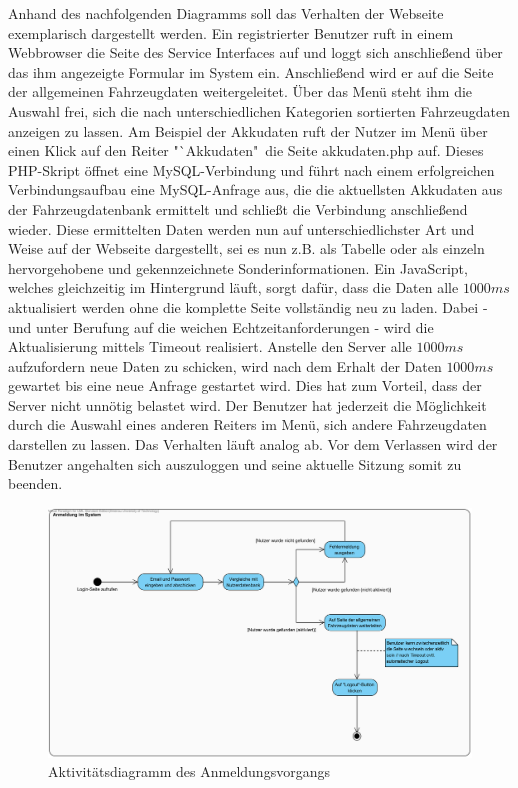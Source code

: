 \documentclass[fontsize = 12pt, paper = a4]{scrreprt}
\begin{document}
Anhand des nachfolgenden Diagramms soll das Verhalten der Webseite exemplarisch dargestellt werden. Ein registrierter Benutzer ruft in einem Webbrowser die Seite des Service Interfaces auf und loggt sich anschließend über das ihm angezeigte Formular im System ein. Anschließend wird er auf die Seite der allgemeinen Fahrzeugdaten weitergeleitet. Über das Menü steht ihm die Auswahl frei, sich die nach unterschiedlichen Kategorien sortierten Fahrzeugdaten anzeigen zu lassen. Am Beispiel der Akkudaten ruft der Nutzer im Menü über einen Klick auf den Reiter "`Akkudaten"\ die Seite akkudaten.php auf. Dieses PHP-Skript öffnet eine MySQL-Verbindung und führt nach einem erfolgreichen Verbindungsaufbau eine MySQL-Anfrage aus, die die aktuellsten Akkudaten aus der Fahrzeugdatenbank ermittelt und schließt die Verbindung anschließend wieder. Diese ermittelten Daten werden nun auf unterschiedlichster Art und Weise auf der Webseite dargestellt, sei es nun z.B. als Tabelle oder als einzeln hervorgehobene und gekennzeichnete Sonderinformationen.
Ein JavaScript, welches gleichzeitig im Hintergrund läuft, sorgt dafür, dass die Daten alle $1000 ms$ aktualisiert werden ohne die komplette Seite vollständig neu zu laden. Dabei - und unter Berufung auf die weichen Echtzeitanforderungen - wird die Aktualisierung mittels Timeout realisiert. Anstelle den Server alle $1000 ms$ aufzufordern neue Daten zu schicken, wird nach dem Erhalt der Daten $1000 ms$ gewartet bis eine neue Anfrage gestartet wird. Dies hat zum Vorteil, dass der Server nicht unnötig belastet wird.
Der Benutzer hat jederzeit die Möglichkeit durch die Auswahl eines anderen Reiters im Menü, sich andere Fahrzeugdaten darstellen zu lassen. Das Verhalten läuft analog ab. Vor dem Verlassen wird der Benutzer angehalten sich auszuloggen und seine aktuelle Sitzung somit zu beenden. \\



\begin{figure}[h]
\centering
\includegraphics[scale = 0.6]{anmeldungsvorgang}
\caption{Aktivitätsdiagramm des Anmeldungsvorgangs}
\end{figure}
\end{document}
